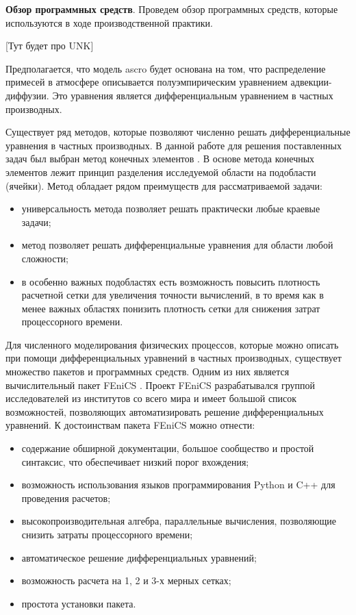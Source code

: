 \textbf{Обзор программных средств}. Проведем обзор программных средств, которые используются в ходе производственной 
практики.

[Тут будет про UNK]

Предполагается, что модель \ac{ascro} будет основана на том, что распределение примесей в атмосфере описывается 
полуэмпирическим уравнением адвекции-диффузии. Это уравнения является дифференциальным уравнением в частных производных. 

Существует ряд методов, которые позволяют численно решать дифференциальные уравнения в частных производных. В данной 
работе для решения поставленных задач был выбран метод конечных элементов \cite{mke}. В основе метода конечных 
элементов лежит принцип разделения исследуемой области на подобласти (ячейки). Метод обладает рядом преимуществ для 
рассматриваемой задачи:

\begin{itemize}
	\item универсальность метода позволяет решать практически любые краевые задачи;
	\item метод позволяет решать дифференциальные уравнения для области любой сложности;
	\item в особенно важных подобластях есть возможность повысить плотность расчетной сетки для увеличения точности 
		вычислений, в то время как в менее важных областях понизить плотность сетки для снижения затрат процессорного 
		времени. 
\end{itemize}

Для численного моделирования физических процессов, которые можно описать при помощи дифференциальных уравнений в 
частных производных, существует множество пакетов и программных средств. Одним из них является вычислительный пакет 
FEniCS \cite{fenics_tut1}. Проект FEniCS разрабатывался группой исследователей из институтов со всего мира и имеет 
большой список возможностей, позволяющих автоматизировать решение дифференциальных уравнений. К достоинствам пакета 
FEniCS можно отнести:

\begin{itemize}
	\item содержание обширной документации, большое сообщество и простой синтаксис, что обеспечивает низкий порог 
		вхождения;
	\item возможность использования языков программирования Python и C++ для проведения расчетов;
	\item высокопроизводительная алгебра, параллельные вычисления, позволяющие снизить затраты процессорного времени; 
	\item автоматическое решение дифференциальных уравнений;
	\item возможность расчета на 1, 2 и 3-х мерных сетках;
	\item простота установки пакета.
\end{itemize} 

